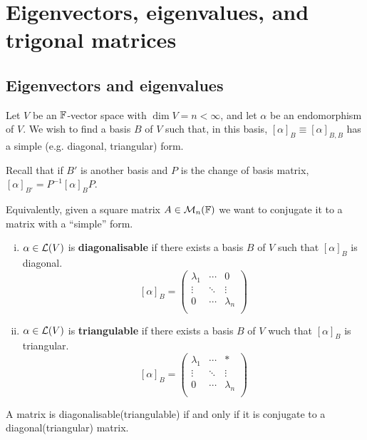 \documentclass[a4paper]{article}
\begin{document}
\section{Eigenvectors, eigenvalues, and trigonal matrices}
\subsection{Eigenvectors and eigenvalues}
Let $ V $ be an $ {\mathbb{F}} $-vector space with $ \dim V = n < \infty $, and let $ \alpha $ be an endomorphism of $ V $.
We wish to find a basis $ B $ of $ V $ such that, in this basis, $ [\alpha]_B \equiv [\alpha]_{B,B} $ has a simple (e.g. diagonal, triangular) form.

Recall that if $ B' $ is another basis and $ P $ is the change of basis matrix, $ [\alpha]_{B'} = P^{-1} [\alpha]_B P $.

Equivalently, given a square matrix $ A \in {\mathcal{M}}_n({\mathbb{F}}) $ we want to conjugate it to a matrix with a ``simple'' form. 

\begin{definition}
	\begin{enumerate}[(i)]
		\item $ \alpha\in {\mathcal{L}}(V) $ is \textbf{diagonalisable} if there exists a basis $B$ of $V$ such that $ [\alpha]_{B} $ is diagonal. 
		\[
			[\alpha]_B = \begin{pmatrix}
				\lambda_1 & \cdots &  0 \\
				\vdots  & \ddots  &  \vdots  \\
				0 & \cdots  &  \lambda_n \\
			\end{pmatrix}
		\]
		\item $ \alpha\in {\mathcal{L}}(V) $ is \textbf{triangulable} if there exists a basis $B$ of $V$ wuch that $ [\alpha]_B $ is triangular.
		\[
			[\alpha]_B = \begin{pmatrix}
				\lambda_1 & \cdots &  * \\
				\vdots  & \ddots  &  \vdots  \\
				0 & \cdots  &  \lambda_n \\
			\end{pmatrix}
		\]
	\end{enumerate}
\end{definition}

\begin{remark}
	A matrix is diagonalisable(triangulable) if and only if it is conjugate to a diagonal(triangular) matrix. 
\end{remark}
\end{document}
